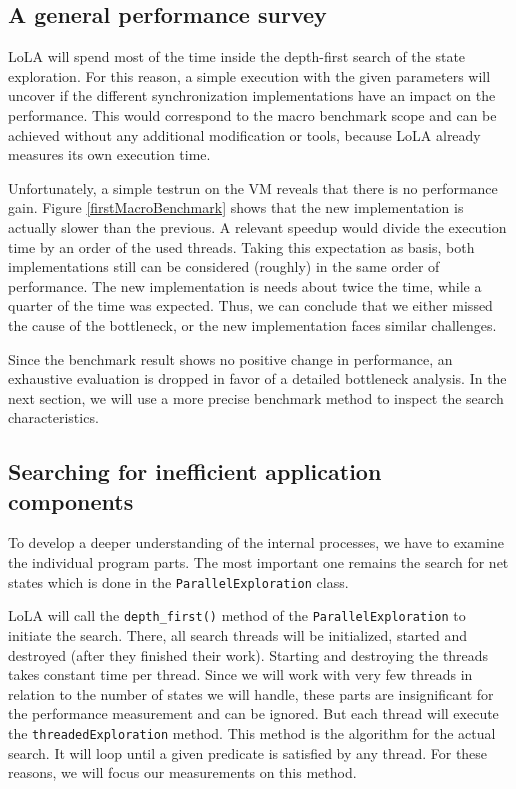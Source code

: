 \subsection{A general performance survey}
LoLA will spend most of the time inside the depth-first search of the state exploration. For this reason, a simple execution with the given parameters will uncover if the different synchronization implementations have an impact on the performance. This would correspond to the macro benchmark scope and can be achieved without any additional modification or tools, because LoLA already measures its own execution time.

Unfortunately, a simple testrun on the VM reveals that there is no performance gain. Figure \ref{firstMacroBenchmark} shows that the new implementation is actually slower than the previous. A relevant speedup would divide the execution time by an order of the used threads. Taking this expectation as basis, both implementations still can be considered (roughly) in the same order of performance. The new implementation is needs about twice the time, while a quarter of the time was expected. Thus, we can conclude that we either missed the cause of the bottleneck, or the new implementation faces similar challenges.



Since the benchmark result shows no positive change in performance, an exhaustive evaluation is dropped in favor of a detailed bottleneck analysis. In the next section, we will use a more precise benchmark method to inspect the search characteristics.

\subsection{Searching for inefficient application components}
To develop a deeper understanding of the internal processes, we have to examine the individual program parts. The most important one remains the search for net states which is done in the \texttt{ParallelExploration} class.

LoLA will call the \texttt{depth\_first()} method of the \texttt{ParallelExploration} to initiate the search. There, all search threads will be initialized, started and destroyed (after they finished their work). Starting and destroying the threads takes constant time per thread. Since we will work with very few threads in relation to the number of states we will handle, these parts are insignificant for the performance measurement and can be ignored. But each thread will execute the \texttt{threadedExploration} method. This method is the algorithm for the actual search. It will loop until a given predicate is satisfied by any thread. For these reasons, we will focus our measurements on this method.

